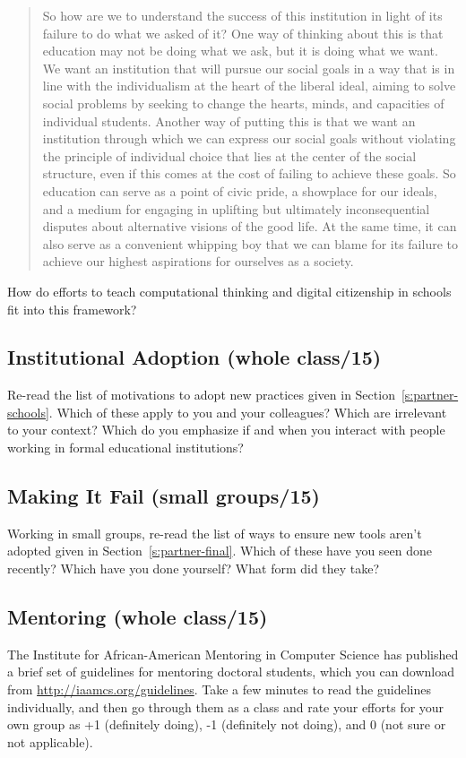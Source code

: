 \begin{quote}

So how are we to understand the success of this institution in light
of its failure to do what we asked of it? One way of thinking about
this is that education may not be doing what we ask, but it is doing
what we want. We want an institution that will pursue our social goals
in a way that is in line with the individualism at the heart of the
liberal ideal, aiming to solve social problems by seeking to change
the hearts, minds, and capacities of individual students. Another way
of putting this is that we want an institution through which we can
express our social goals without violating the principle of individual
choice that lies at the center of the social structure, even if this
comes at the cost of failing to achieve these goals. So education can
serve as a point of civic pride, a showplace for our ideals, and a
medium for engaging in uplifting but ultimately inconsequential
disputes about alternative visions of the good life. At the same time,
it can also serve as a convenient whipping boy that we can blame for
its failure to achieve our highest aspirations for ourselves as a
society.

\end{quote}

How do efforts to teach computational thinking and digital citizenship
in schools fit into this framework?

\subsection*{Institutional Adoption (whole class/15)}

Re-read the list of motivations to adopt new practices given in
Section~\ref{s:partner-schools}. Which of these apply to you and your
colleagues? Which are irrelevant to your context? Which do you emphasize
if and when you interact with people working in formal educational
institutions?

\subsection*{Making It Fail (small groups/15)}

Working in small groups, re-read the list of ways to ensure new tools
aren't adopted given in Section~\ref{s:partner-final}. Which of these
have you seen done recently? Which have you done yourself? What form did
they take?

\subsection*{Mentoring (whole class/15)}

The Institute for African-American Mentoring in Computer Science has
published a brief set of guidelines for mentoring doctoral students,
which you can download from \url{http://iaamcs.org/guidelines}. Take a few
minutes to read the guidelines individually, and then go through them as
a class and rate your efforts for your own group as +1 (definitely
doing), -1 (definitely not doing), and 0 (not sure or not applicable).
